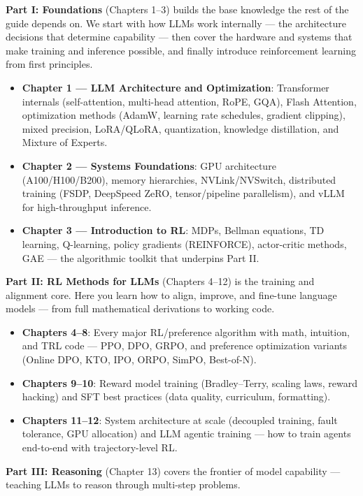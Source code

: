 \documentclass[11pt,a4paper,openany]{book}
\begin{document}
\textbf{Part I: Foundations} (Chapters 1--3) builds the base knowledge the rest of the guide depends on. We start with how LLMs work internally --- the architecture decisions that determine capability --- then cover the hardware and systems that make training and inference possible, and finally introduce reinforcement learning from first principles.

\begin{itemize}
  \item \textbf{Chapter 1 --- LLM Architecture and Optimization}: Transformer internals (self-attention, multi-head attention, RoPE, GQA), Flash Attention, optimization methods (AdamW, learning rate schedules, gradient clipping), mixed precision, LoRA/QLoRA, quantization, knowledge distillation, and Mixture of Experts.
  \item \textbf{Chapter 2 --- Systems Foundations}: GPU architecture (A100/H100/B200), memory hierarchies, NVLink/NVSwitch, distributed training (FSDP, DeepSpeed ZeRO, tensor/pipeline parallelism), and vLLM for high-throughput inference.
  \item \textbf{Chapter 3 --- Introduction to RL}: MDPs, Bellman equations, TD learning, Q-learning, policy gradients (REINFORCE), actor-critic methods, GAE --- the algorithmic toolkit that underpins Part II.
\end{itemize}

\textbf{Part II: RL Methods for LLMs} (Chapters 4--12) is the training and alignment core. Here you learn how to align, improve, and fine-tune language models --- from full mathematical derivations to working code.

\begin{itemize}
  \item \textbf{Chapters 4--8}: Every major RL/preference algorithm with math, intuition, and TRL code --- PPO, DPO, GRPO, and preference optimization variants (Online DPO, KTO, IPO, ORPO, SimPO, Best-of-N).
  \item \textbf{Chapters 9--10}: Reward model training (Bradley--Terry, scaling laws, reward hacking) and SFT best practices (data quality, curriculum, formatting).
  \item \textbf{Chapters 11--12}: System architecture at scale (decoupled training, fault tolerance, GPU allocation) and LLM agentic training --- how to train agents end-to-end with trajectory-level RL.
\end{itemize}

\textbf{Part III: Reasoning} (Chapter 13) covers the frontier of model capability --- teaching LLMs to reason through multi-step problems.
\end{document}
